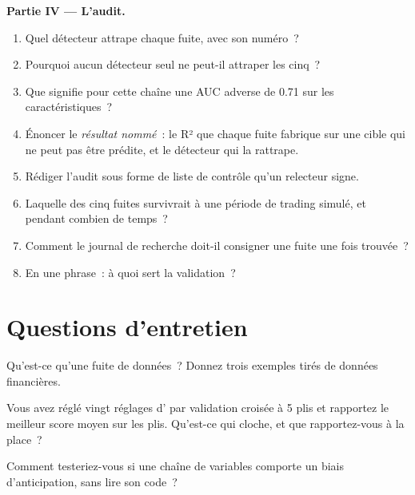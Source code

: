 \begin{problem}
\medskip\noindent\textbf{Partie IV --- L'audit.}
\begin{enumerate}[resume]
\item Quel détecteur attrape chaque fuite, avec son numéro~?
\item Pourquoi aucun détecteur seul ne peut-il attraper les cinq~?
\item Que signifie pour cette chaîne une AUC adverse de 0.71 sur les caractéristiques~?
\item Énoncer le \emph{résultat nommé}~: le R² que chaque fuite fabrique sur une cible qui ne peut pas être prédite, et le
détecteur qui la rattrape.
\item Rédiger l'audit sous forme de liste de contrôle qu'un relecteur signe.
\item Laquelle des cinq fuites survivrait à une période de trading simulé, et pendant combien de temps~?
\item Comment le journal de recherche doit-il consigner une fuite une fois trouvée~?
\item En une phrase~: à quoi sert la validation~?
\end{enumerate}
\end{problem}

\section{Questions d'entretien}

\begin{interviewq}\label{iq:ml:validation:1}
Qu'est-ce qu'une fuite de données~? Donnez trois exemples tirés de données financières.
\end{interviewq}

\begin{interviewq}\label{iq:ml:validation:2}
Vous avez réglé vingt réglages d' par validation croisée à 5 plis et rapportez le meilleur score moyen sur les plis. Qu'est-ce qui
cloche, et que rapportez-vous à la place~?
\end{interviewq}

\begin{interviewq}\label{iq:ml:validation:3}
Comment testeriez-vous si une chaîne de variables comporte un biais d'anticipation, sans lire son code~?
\end{interviewq}


